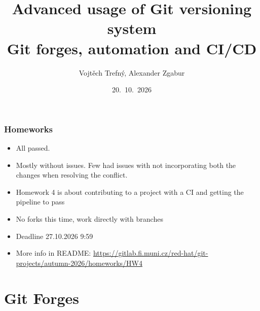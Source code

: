 \documentclass[aspectratio=169]{beamer}
\title[Advanced usage of Git versioning system]{Advanced usage of Git versioning system\\ \small Git forges, automation and CI/CD}
\author{Vojtěch Trefný, Alexander Zgabur}
\date{20.~10.~2026}
\begin{document}
{ 
\begin{frame}
\titlepage
\end{frame}
}

\newcommand*\openquote{\makebox(25,-22){\scalebox{5}{``}}}
\newcommand*\closequote{\makebox(25,-22){\scalebox{5}{''}}}


\begin{frame}
	\frametitle{Homeworks}


	\begin{block}{\color{orange}{Homework 3}}
		\begin{itemize}
			\item All passed.
			\item Mostly without issues. Few had issues with not incorporating both the changes when resolving the conflict.
		\end{itemize}
	\end{block}

	\begin{block}{\color{orange}{Homework 4}}
		\begin{itemize}
			\item Homework 4 is about contributing to a project with a CI and getting the pipeline to pass
			\item No forks this time, work directly with branches
			\item Deadline 27.10.2026 9:59
			\item More info in README: \url{https://gitlab.fi.muni.cz/red-hat/git-projects/autumn-2026/homeworks/HW4}
		\end{itemize}
	\end{block}

\end{frame}

\section{Git Forges}
\end{document}
